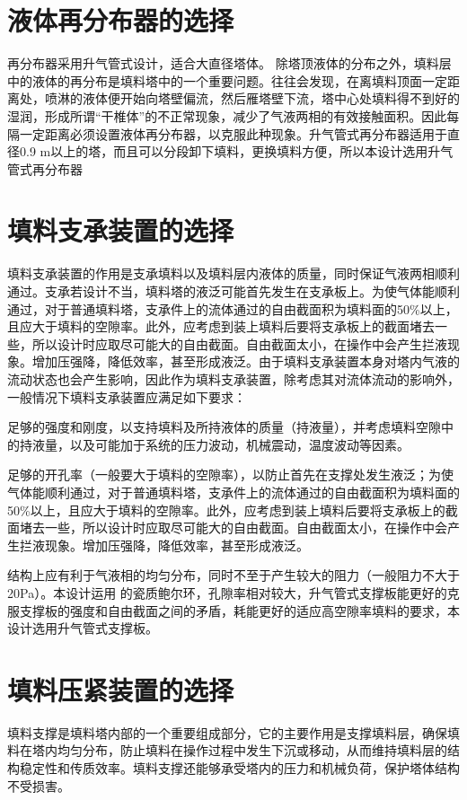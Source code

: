 \section{液体再分布器的选择}
再分布器采用升气管式设计，适合大直径塔体。
除塔顶液体的分布之外，填料层中的液体的再分布是填料塔中的一个重要问题。往往会发现，在离填料顶面一定距离处，喷淋的液体便开始向塔壁偏流，然后雁塔壁下流，塔中心处填料得不到好的湿润，形成所谓“干椎体”的不正常现象，减少了气液两相的有效接触面积。因此每隔一定距离必须设置液体再分布器，以克服此种现象。升气管式再分布器适用于直径0.9 m以上的塔，而且可以分段卸下填料，更换填料方便，所以本设计选用升气管式再分布器



\section{填料支承装置的选择}
填料支承装置的作用是支承填料以及填料层内液体的质量，同时保证气液两相顺利通过。支承若设计不当，填料塔的液泛可能首先发生在支承板上。为使气体能顺利通过，对于普通填料塔，支承件上的流体通过的自由截面积为填料面的50\%以上，且应大于填料的空隙率。此外，应考虑到装上填料后要将支承板上的截面堵去一些，所以设计时应取尽可能大的自由截面。自由截面太小，在操作中会产生拦液现象。增加压强降，降低效率，甚至形成液泛。由于填料支承装置本身对塔内气液的流动状态也会产生影响，因此作为填料支承装置，除考虑其对流体流动的影响外，一般情况下填料支承装置应满足如下要求：

足够的强度和刚度，以支持填料及所持液体的质量（持液量），并考虑填料空隙中的持液量，以及可能加于系统的压力波动，机械震动，温度波动等因素。

足够的开孔率（一般要大于填料的空隙率），以防止首先在支撑处发生液泛；为使气体能顺利通过，对于普通填料塔，支承件上的流体通过的自由截面积为填料面的50\%以上，且应大于填料的空隙率。此外，应考虑到装上填料后要将支承板上的截面堵去一些，所以设计时应取尽可能大的自由截面。自由截面太小，在操作中会产生拦液现象。增加压强降，降低效率，甚至形成液泛。

结构上应有利于气液相的均匀分布，同时不至于产生较大的阻力（一般阻力不大于20Pa）。本设计运用 的瓷质鲍尔环，孔隙率相对较大，升气管式支撑板能更好的克服支撑板的强度和自由截面之间的矛盾，耗能更好的适应高空隙率填料的要求，本设计选用升气管式支撑板。



\section{填料压紧装置的选择}
填料支撑是填料塔内部的一个重要组成部分，它的主要作用是支撑填料层，确保填料在塔内均匀分布，防止填料在操作过程中发生下沉或移动，从而维持填料层的结构稳定性和传质效率。填料支撑还能够承受塔内的压力和机械负荷，保护塔体结构不受损害。


